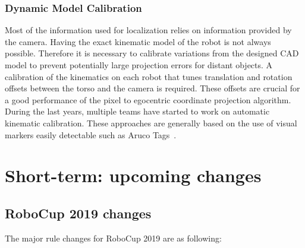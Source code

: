 \documentclass{article}
\begin{document}
\subsubsection{Dynamic Model Calibration}
Most of the information used for localization relies on information provided by the camera. 
Having the exact kinematic model of the robot is not always possible. 
Therefore it is necessary to calibrate variations from the designed CAD model to prevent potentially large projection errors for distant objects. 
A calibration of the kinematics on each robot that tunes translation and rotation offsets between the torso and the camera is required. 
These offsets are crucial for a good performance of the pixel to egocentric coordinate projection algorithm.
During the last years, multiple teams have started to work on automatic kinematic calibration. 
These approaches are generally based on the use of visual markers easily detectable such as Aruco Tags~\cite{Garrido-Jurado2014}.




\section{\label{sec:ShortTerm}Short-term: upcoming changes}

\subsection{RoboCup 2019 changes}

The major rule changes for RoboCup 2019 are as following:
\end{document}
